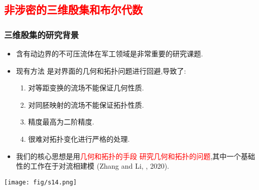 \documentclass[UTF8]{ctexbeamer}	%
\theoremstyle{plain}
\theoremstyle{definition}
\theoremstyle{remark}
\numberwithin{equation}{section}
\begin{document}
\subsection{\textcolor{red}{非涉密的三维殷集和布尔代数}}
\begin{frame}
    \frametitle{三维殷集的研究背景}
    \begin{itemize}
        \item 含有动边界的不可压流体在军工领域是非常重要的研究课题.
        \item 现有方法
              是对界面的几何和拓扑问题进行回避,导致了:
              \begin{enumerate}
                  \item 对等距变换的流场不能保证几何性质.
                  \item 对同胚映射的流场不能保证拓扑性质.
                  \item 精度最高为二阶精度.
                  \item 很难对拓扑变化进行严格的处理.
              \end{enumerate}
        \item 我们的核心思想是用\textcolor{red}{几何和拓扑的手段
                  研究几何和拓扑的问题},其中一个基础性的工作在于对流相建模
              (Zhang and Li, , 2020).





    \end{itemize}
    \begin{center}
        \texttt{[image: fig/s14.png]}
    \end{center}
\end{frame}
\end{document}
